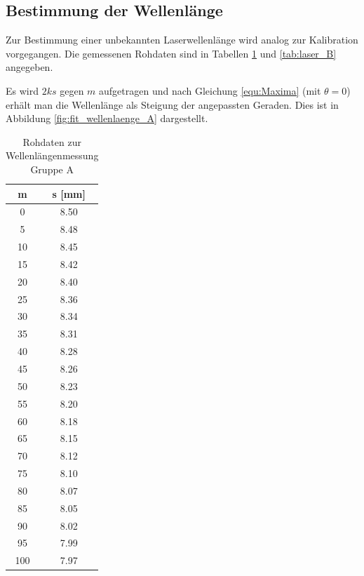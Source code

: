 \documentclass[12pt,a4paper]{article}
\begin{document}
\subsection{Bestimmung der Wellenlänge}

Zur Bestimmung einer unbekannten Laserwellenlänge wird analog zur Kalibration vorgegangen. 
Die gemessenen Rohdaten sind in Tabellen \ref{tab:laser_A} und \ref{tab:laser_B} angegeben.

Es wird $2ks$ gegen $m$ aufgetragen und nach Gleichung \ref{equ:Maxima} (mit $\theta = 0$) erhält man die Wellenlänge als Steigung der angepassten Geraden. Dies ist in Abbildung \ref{fig:fit_wellenlaenge_A} dargestellt.

\begin{table}
	\begin{minipage}{0.5\textwidth}
		\centering
		\begin{tabular}{|c|c|}
			\hline
			m & s [mm] \\
			\hline
			0 & 8.50 \\
			\hline
			5 & 8.48 \\
			\hline
			10 & 8.45 \\
			\hline
			15 & 8.42 \\
			\hline
			20 & 8.40 \\
			\hline
			25 & 8.36 \\
			\hline
			30 & 8.34 \\
			\hline
			35 & 8.31 \\
			\hline
			40 & 8.28 \\
			\hline
			45 & 8.26 \\
			\hline
			50 & 8.23 \\
			\hline
			55 & 8.20 \\
			\hline
			60 & 8.18 \\
			\hline
			65 & 8.15 \\
			\hline
			70 & 8.12 \\
			\hline
			75 & 8.10 \\
			\hline
			80 & 8.07 \\
			\hline
			85 & 8.05 \\
			\hline
			90 & 8.02 \\
			\hline
			95 & 7.99 \\
			\hline
			100 & 7.97 \\
			\hline
		\end{tabular}
		\caption{Rohdaten zur Wellenlängenmessung Gruppe A}
		\label{tab:laser_A}
	\end{minipage}
	\begin{minipage}{0.5\textwidth}

\end{minipage}
\end{table}
\end{document}
